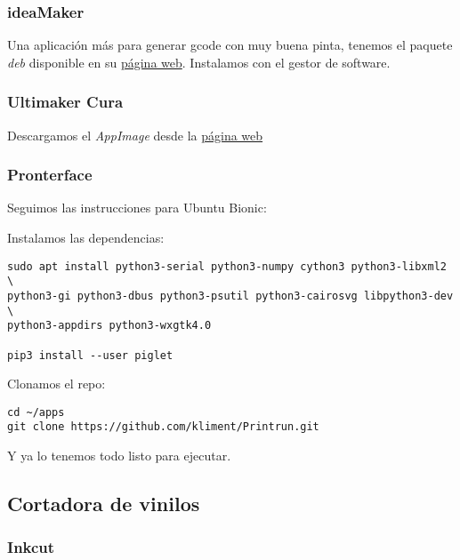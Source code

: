 \documentclass[
  12pt,
  spanish,
]{article}
\begin{document}
\hypertarget{ideamaker}{%
\subsubsection{ideaMaker}\label{ideamaker}}

Una aplicación más para generar gcode con muy buena pinta, tenemos el
paquete \emph{deb} disponible en su
\href{https://www.raise3d.com/pages/ideamaker}{página web}. Instalamos
con el gestor de software.

\hypertarget{ultimaker-cura}{%
\subsubsection{Ultimaker Cura}\label{ultimaker-cura}}

Descargamos el \emph{AppImage} desde la
\href{https://github.com/Ultimaker/Cura/releases}{página web}

\hypertarget{pronterface}{%
\subsubsection{Pronterface}\label{pronterface}}

Seguimos las instrucciones para Ubuntu Bionic:

Instalamos las dependencias:

\begin{verbatim}
sudo apt install python3-serial python3-numpy cython3 python3-libxml2 \
python3-gi python3-dbus python3-psutil python3-cairosvg libpython3-dev \
python3-appdirs python3-wxgtk4.0

pip3 install --user piglet
\end{verbatim}

Clonamos el repo:

\begin{verbatim}
cd ~/apps
git clone https://github.com/kliment/Printrun.git
\end{verbatim}

Y ya lo tenemos todo listo para ejecutar.

\hypertarget{cortadora-de-vinilos}{%
\subsection{Cortadora de vinilos}\label{cortadora-de-vinilos}}

\hypertarget{inkcut}{%
\subsubsection{Inkcut}\label{inkcut}}
\end{document}
